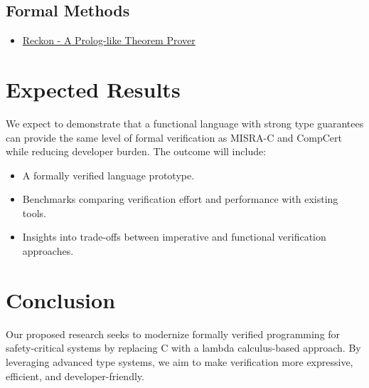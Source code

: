 \documentclass[conference]{IEEEtran}
\begin{document}
\subsection{Formal Methods}
\begin{itemize}
    \item \href{https://github.com/adam-mcdaniel/reckon}{Reckon - A Prolog-like Theorem Prover}
\end{itemize}

\section{Expected Results}

We expect to demonstrate that a functional language with strong type guarantees can provide the same level of formal verification as MISRA-C and CompCert while reducing developer burden. The outcome will include:

\begin{itemize}
    \item A formally verified language prototype.
    \item Benchmarks comparing verification effort and performance with existing tools.
    \item Insights into trade-offs between imperative and functional verification approaches.
\end{itemize}

\section{Conclusion}

Our proposed research seeks to modernize formally verified programming for safety-critical systems by replacing C with a lambda calculus-based approach. By leveraging advanced type systems, we aim to make verification more expressive, efficient, and developer-friendly.
\end{document}
